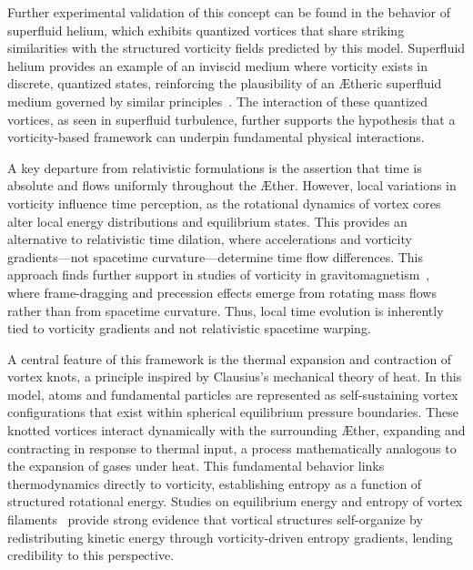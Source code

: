 Further experimental validation of this concept can be found in the behavior of superfluid helium, which exhibits quantized vortices that share striking similarities with the structured vorticity fields predicted by this model.
Superfluid helium provides an example of an inviscid medium where vorticity exists in discrete, quantized states, reinforcing the plausibility of an \AE theric superfluid medium governed by similar principles~\cite{vinen2002}.
The interaction of these quantized vortices, as seen in superfluid turbulence, further supports the hypothesis that a vorticity-based framework can underpin fundamental physical interactions.

A key departure from relativistic formulations is the assertion that time is absolute and flows uniformly throughout the \AE ther.
However, local variations in vorticity influence time perception, as the rotational dynamics of vortex cores alter local energy distributions and equilibrium states.
This provides an alternative to relativistic time dilation, where accelerations and vorticity gradients—not spacetime curvature—determine time flow differences.
This approach finds further support in studies of vorticity in gravitomagnetism~\cite{cahill2005}, where frame-dragging and precession effects emerge from rotating mass flows rather than from spacetime curvature.
Thus, local time evolution is inherently tied to vorticity gradients and not relativistic spacetime warping.

A central feature of this framework is the thermal expansion and contraction of vortex knots, a principle inspired by Clausius’s mechanical theory of heat.
In this model, atoms and fundamental particles are represented as self-sustaining vortex configurations that exist within spherical equilibrium pressure boundaries.
These knotted vortices interact dynamically with the surrounding \AE ther, expanding and contracting in response to thermal input, a process mathematically analogous to the expansion of gases under heat.
This fundamental behavior links thermodynamics directly to vorticity, establishing entropy as a function of structured rotational energy.
Studies on equilibrium energy and entropy of vortex filaments~\cite{belik2023} provide strong evidence that vortical structures self-organize by redistributing kinetic energy through vorticity-driven entropy gradients, lending credibility to this perspective.

